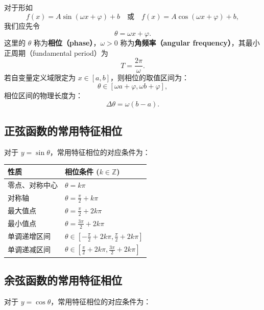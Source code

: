 \documentclass[11pt,a4paper]{ctexart}
\begin{document}
对于形如
$$f(x) = A\sin(\omega x+\varphi) + b \quad \text{或} \quad f(x) = A\cos(\omega x+\varphi) + b,$$
我们应先令
$$\theta = \omega x + \varphi.$$
这里的 $\theta$ 称为\textbf{相位（phase）}，$\omega>0$ 称为\textbf{角频率（angular frequency）}，其最小正周期（fundamental period）为
$$T = \frac{2\pi}{\omega}.$$
若自变量定义域限定为 $x \in [a, b]$，则相位的取值区间为：
$$\theta \in [\omega a + \varphi, \omega b + \varphi],$$
相位区间的物理长度为：
$$\Delta\theta = \omega(b-a).$$


\subsection{正弦函数的常用特征相位}
对于 $y = \sin\theta$，常用特征相位的对应条件为：

\begin{tabularx}{\textwidth}{p{3.5cm}X}
\toprule[1.2pt]
\textbf{性质} & \textbf{相位条件 ($k\in\mathbb{Z}$)} \\ \midrule
零点、对称中心 & $\theta = k\pi$ \\ \midrule
对称轴 & $\theta = \frac{\pi}{2} + k\pi$ \\ \midrule
最大值点 & $\theta = \frac{\pi}{2} + 2k\pi$ \\ \midrule
最小值点 & $\theta = \frac{3\pi}{2} + 2k\pi$ \\ \midrule
单调递增区间 & $\theta \in \left[-\frac{\pi}{2} + 2k\pi, \frac{\pi}{2} + 2k\pi\right]$ \\ \midrule
单调递减区间 & $\theta \in \left[\frac{\pi}{2} + 2k\pi, \frac{3\pi}{2} + 2k\pi\right]$ \\ 
\bottomrule[1.2pt]
\end{tabularx}

\subsection{余弦函数的常用特征相位}
对于 $y = \cos\theta$，常用特征相位的对应条件为：
\end{document}
